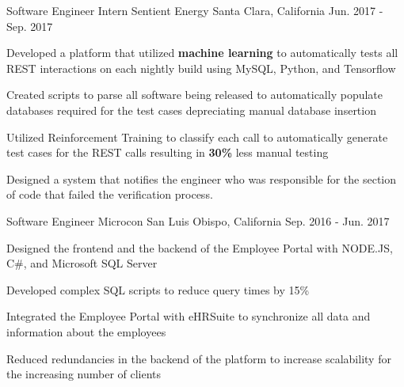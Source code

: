 


\begin{cventries}


\cventry
{Software Engineer Intern} %
{Sentient Energy} %
{Santa Clara, California} %
{Jun. 2017 - Sep. 2017} %
{ %
\begin{cvitems}
\item {Developed a platform that utilized \textbf{machine learning} to automatically tests all REST interactions on each nightly build using MySQL, Python, and Tensorflow}    
\item {Created scripts to parse all software being released to automatically populate databases required for the test cases depreciating manual database insertion}
\item {Utilized Reinforcement Training to classify each call to automatically generate test cases for the REST calls resulting in \textbf{30\%} less manual testing}
\item {Designed a system that notifies the engineer who was responsible for the section of code that failed the verification process.}
\end{cvitems}
}


\cventry
{Software Engineer} %
{Microcon} %
{San Luis Obispo, California} %
{Sep. 2016 - Jun. 2017} %
{ %
\begin{cvitems}
\item {Designed the frontend and the backend of the Employee Portal with NODE.JS, C\#, and Microsoft SQL Server}
\item {Developed complex SQL scripts to reduce query times by 15\%}
\item {Integrated the Employee Portal with eHRSuite to synchronize all data and information about the employees}
\item {Reduced redundancies in the backend of the platform to increase scalability for the increasing number of clients}
\end{cvitems}
}


\end{cventries}
